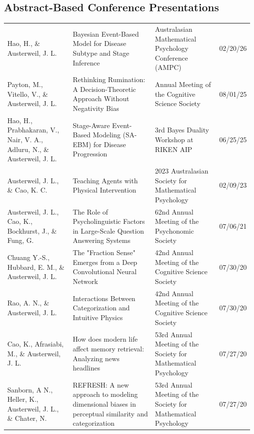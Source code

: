 \documentclass[a4paper,10pt]{article}
\begin{document}
\subsection{Abstract-Based Conference Presentations}
\vspace{-4mm}
\tabulinesep=1.2mm
\begin{longtabu} to \linewidth {XXXr}

Hao, H., \& Austerweil, J. L. & Bayesian Event-Based Model for Disease Subtype and Stage Inference & Australasian Mathematical Psychology Conference (AMPC) & 02/20/26 \\

Payton, M., Vitello, V., \& Austerweil, J. L. & Rethinking Rumination: A Decision-Theoretic Approach Without Negativity Bias & Annual Meeting of the Cognitive Science Society & 08/01/25 \\

 Hao, H., Prabhakaran, V., Nair, V. A., Adluru, N., \& Austerweil, J. L. & Stage-Aware Event-Based Modeling (SA-EBM) for Disease Progression & 3rd Bayes Duality Workshop at RIKEN AIP & 06/25/25 \\

Austerweil, J. L., \& Cao, K. C. & Teaching Agents with Physical Intervention & 2023 Australasian Society for Mathematical Psychology & 02/09/23 \\

Austerweil, J. L., Cao, K., Bockhurst, J., \& Fung, G. & The Role of Psycholinguistic Factors in Large-Scale Question Answering Systems & 62nd Annual Meeting of the Psychonomic Society & 07/06/21 \\

Chuang Y.-S., Hubbard, E. M., \& Austerweil, J. L. & The "Fraction Sense" Emerges from a Deep Convolutional Neural Network &  42nd Annual Meeting of the Cognitive Science Society & 07/30/20 \\

Rao, A. N., \& Austerweil, J. L. & Interactions Between Categorization and Intuitive Physics & 42nd Annual Meeting of the Cognitive Science Society & 07/30/20 \\

Cao, K., Afrasiabi, M., \& Austerweil, J. L. & How does modern life affect memory retrieval: Analyzing news headlines &  53rd Annual Meeting of the Society for Mathematical Psychology & 07/27/20 \\

Sanborn, A N., Heller, K., Austerweil, J. L., \& Chater, N. & {REFRESH}: A new approach to modeling dimensional biases in perceptual similarity and categorization & 53rd Annual Meeting of the Society for Mathematical Psychology & 07/27/20 \\



\end{longtabu}
\end{document}
